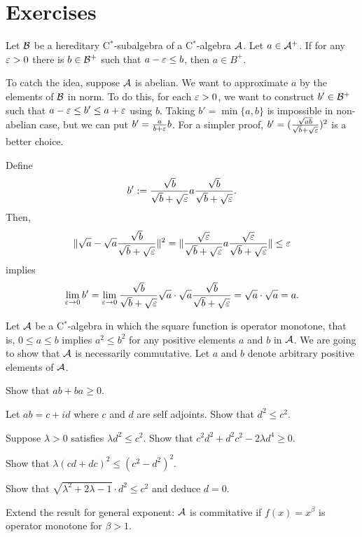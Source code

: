 \documentclass{../../large}
\begin{document}
\section*{Exercises}


\begin{prb}
Let $\mathcal{B}$ be a hereditary C$^*$-subalgebra of a C$^*$-algebra $\mathcal{A}$.
Let $a\in\mathcal{A}^+$.
If for any $\varepsilon>0$ there is $b\in\mathcal{B}^+$ such that $a-\varepsilon\le b$, then $a\in B^+$.
\end{prb}
\begin{pf}
To catch the idea, suppose $\mathcal{A}$ is abelian.
We want to approximate $a$ by the elements of $\mathcal{B}$ in norm.
To do this, for each $\varepsilon>0$, we want to construct $b'\in\mathcal{B}^+$ such that $a-\varepsilon\le b'\le a+\varepsilon$ using $b$.
Taking $b'=\min\{a,b\}$ is impossible in non-abelian case, but we can put $b'=\frac a{b+\varepsilon}b$.
For a simpler proof, $b'=(\frac{\sqrt{ab}}{\sqrt b+\sqrt{\varepsilon}})^2$ is a better choice.

Define
\[b':=\frac{\sqrt b}{\sqrt b+\sqrt{\varepsilon}}a\frac{\sqrt b}{\sqrt b+\sqrt{\varepsilon}}.\]
Then,
\[\|\sqrt a-\sqrt a\frac{\sqrt b}{\sqrt b+\sqrt{\varepsilon}}\|^2=\|\frac{\sqrt{\varepsilon}}{\sqrt b+\sqrt{\varepsilon}}a\frac{\sqrt{\varepsilon}}{\sqrt b+\sqrt{\varepsilon}}\|\le\varepsilon\]
implies
\[\lim_{\varepsilon\to0}b'=\lim_{\varepsilon\to0}\frac{\sqrt b}{\sqrt b+\sqrt{\varepsilon}}\sqrt a\cdot\sqrt a\frac{\sqrt b}{\sqrt b+\sqrt{\varepsilon}}=\sqrt a\cdot\sqrt a=a.\]
\end{pf}

\begin{prb}
Let $\mathcal{A}$ be a C$^*$-algebra in which the square function is operator monotone, that is, $0\le a\le b$ implies $a^2\le b^2$ for any positive elements $a$ and $b$ in $\mathcal{A}$.
We are going to show that $\mathcal{A}$ is necessarily commutative.
Let $a$ and $b$ denote arbitrary positive elements of $\mathcal{A}$.
\begin{parts}
\item
Show that $ab+ba\ge0$.
\item
Let $ab=c+id$ where $c$ and $d$ are self adjoints.
Show that $d^2\le c^2$.
\item
Suppose $\lambda>0$ satisfies $\lambda d^2\le c^2$.
Show that $c^2d^2+d^2c^2-2\lambda d^4\ge0$.
\item
Show that $\lambda(cd+dc)^2\le(c^2-d^2)^2$.
\item
Show that $\sqrt{\lambda^2+2\lambda-1}\cdot d^2\le c^2$ and deduce $d=0$.
\item
Extend the result for general exponent: $\mathcal{A}$ is commitative if $f(x)=x^\beta$ is operator monotone for $\beta>1$.
\end{parts}
\end{prb}
\end{document}
